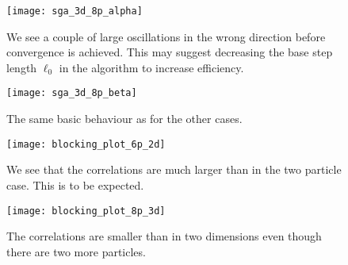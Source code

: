 \clearpage

\begin{figure}[!p]
  \begin{center}
    \texttt{[image: sga\_3d\_8p\_alpha]}
  \end{center}
  \caption{We see a couple of large oscillations in the wrong direction before convergence is achieved. This may suggest decreasing the base step length $\ell_0$ in the algorithm to increase efficiency.}
\label{fig:sga_3d_8p_alpha}
\end{figure}

\begin{figure}[!p]
  \begin{center}
    \texttt{[image: sga\_3d\_8p\_beta]}
  \end{center}
  \caption{The same basic behaviour as for the other cases.}
  \label{fig:sga_3d_8p_beta}
\end{figure}

\clearpage

\begin{figure}[!p]
  \begin{center}
    \texttt{[image: blocking\_plot\_6p\_2d]}
  \end{center}
  \caption{We see that the correlations are much larger than in the two particle case. This is to be expected.}
  \label{fig:blocking_plot_6p_2d}
\end{figure}

\begin{figure}[!p]
  \begin{center}
    \texttt{[image: blocking\_plot\_8p\_3d]}
  \end{center}
  \caption{The correlations are smaller than in two dimensions even though there are two more particles.}
  \label{fig:blocking_plot_8p_3d}
\end{figure}
